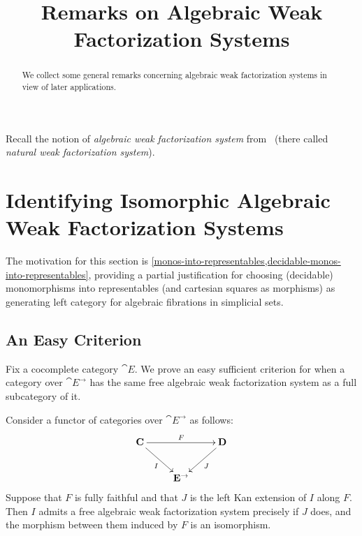 \documentclass[reqno,10pt,a4paper,oneside]{amsart}
\title{Remarks on Algebraic Weak Factorization Systems}
\begin{document}
\begin{abstract}
We collect some general remarks concerning algebraic weak factorization systems in view of later applications.
\end{abstract}

\maketitle

\tableofcontents

Recall the notion of \emph{algebraic weak factorization system} from~\cite{garner:small-object-argument} (there called \emph{natural weak factorization system}).

\section{Identifying Isomorphic Algebraic Weak Factorization Systems}

The motivation for this section is \cref{monos-into-representables,decidable-monos-into-representables}, providing a partial justification for choosing (decidable) monomorphisms into representables (and cartesian squares as morphisms) as generating left category for algebraic fibrations in simplicial sets.

\subsection{An Easy Criterion}

Fix a cocomplete category $\cat{E}$. 
We prove an easy sufficient criterion for when a category over $\cat{E}^{\to}$ has the same free algebraic weak factorization system as a full subcategory of it.

\begin{proposition}
\label{criterion-for-cats-generating-same-awfs}
Consider a functor of categories over $\cat{E}^{\to}$ as follows:
\[
\xymatrix{
  \cat{C}
  \ar[rr]^{F}
  \ar[dr]_{I}
&&
  \cat{D}
  \ar[dl]^{J}
\\&
  \cat{E}^{\to}
}
\]
Suppose that $F$ is fully faithful and that $J$ is the left Kan extension of $I$ along $F$.
Then $I$ admits a free algebraic weak factorization system precisely if $J$ does, and the morphism between them induced by $F$ is an isomorphism.
\end{proposition}
\end{document}

